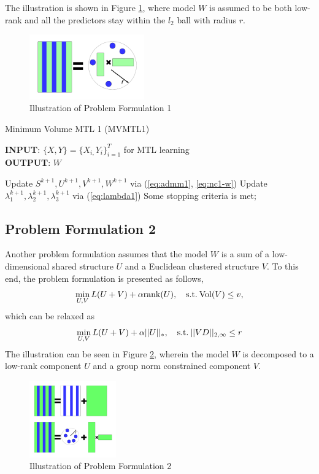 \documentclass[twoside,leqno,twocolumn]{article}
\begin{document}
%
The illustration is shown in Figure \ref{fig:mtl1}, where model $W$ is assumed to be both low-rank and all the predictors stay within the $l_2$ ball with radius $r$.
%
\begin{figure}[!htb]
\includegraphics[width= .5\textwidth, height=1.1in]{figures/mtl1.pdf}
\caption{Illustration of Problem Formulation 1}
\label{fig:mtl1}
\end{figure}
%
%
\begin{algorithm}
\label{alg:mvmtl1}
\caption{Minimum Volume MTL 1 (MVMTL1) }
\textbf{INPUT}: $\{X,Y\}=\{X_{i,}Y_{i}\}_{i=1}^{T}$ for MTL learning\\
\textbf{OUTPUT}: $W$ 
\begin{algorithmic}[1]
\REPEAT
\STATE Update ${S^{k+1}},{U^{k+1}},{V^{k+1}},{W^{k+1}}$ via (\ref{eq:admm1}, \ref{eq:nc1-w})
\STATE Update $\lambda^{k+1}_{1},\lambda^{k+1}_{2},\lambda^{k+1}_{3}$ via (\ref{eq:lambda1})
\UNTIL Some stopping criteria is met;
\end{algorithmic}
\end{algorithm}

\subsection{Problem Formulation 2}

Another problem formulation assumes that the model $W$ is a sum of a low-dimensional shared structure $U$ and a Euclidean clustered structure $V$. To this end, the problem formulation is presented as follows,
%
\begin{equation}
\mathop {\min }\limits_{U,V} L(U+V)
 + \alpha {\rm{rank}}(U),\quad{\rm{s.t.}}\:{\rm{Vol}}(V) \le v,
\label{eq:nonconvex2}
\end{equation}
which can be relaxed as
\begin{equation}
\mathop {\min }\limits_{U,V} L(U+V)  + \alpha ||U|{|_*},\quad{\rm{s.t.}}\:||VD|{|_{2,\infty }} \le  r
\label{eq:nc2-2}
\end{equation}
The illustration can be seen in Figure \ref{fig:mtl2}, wherein the model $W$ is decomposed to a low-rank component $U$ and a group norm constrained component $V$.
\begin{figure}[h]
\includegraphics[width= .5\textwidth, height=1.3in]{figures/mtl2.pdf}
\caption{Illustration of Problem Formulation 2}
\label{fig:mtl2}
\end{figure}
\end{document}
